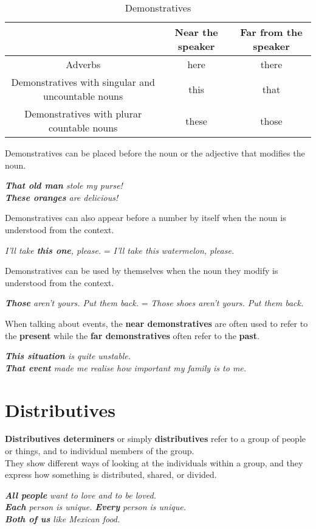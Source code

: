 \documentclass[10pt,a4paper]{article}
\begin{document}
\begin{table}[h]
\begin{center}
\begin{tabular}{|c|c|c|}
		\hline
		     	 & \textbf{Near the speaker} & \textbf{Far from the speaker} \\ \hline
		Adverbs  & here & there \\ \hline
		Demonstratives with singular and uncountable nouns & this & that \\ \hline
		Demonstratives with plurar countable nouns & these & those\\ \hline
\end{tabular}
\end{center}
\caption{\label{tab:nouns7}Demonstratives}
\end{table}
\newpage
Demonstratives can be placed before the noun or the adjective that modifies the noun.
\begin{center}
\textit{ \textbf{That old man} stole my purse!\\
\textbf{These oranges} are delicious!}
\end{center}
Demonstratives can also appear before a number by itself when the noun is understood from the context.
\begin{center}
\textit{I'll take \textbf{this one}, please.} = \textit{I'll take this watermelon, please.}
\end{center}
Demonstratives can be used by themselves when the noun they modify is understood from the context.
\begin{center}
\textit{ \textbf{Those} aren't yours. Put them back.} = \textit{Those shoes aren't yours. Put them back.}
\end{center}
When talking about events, the \textbf{near demonstratives} are often used to refer to the \textbf{present} while the \textbf{far demonstratives} often refer to the \textbf{past}.
\begin{center}
\textit{ \textbf{This situation} is quite unstable. \\
\textbf{That event} made me realise how important my family is to me.}
\end{center}

\section{Distributives}
\textbf{Distributives determiners} or simply \textbf{distributives} refer to a group of people or things, and to individual members of the group.\\
\indent They show different ways of looking at the individuals within a group, and they express how something is distributed, shared, or divided.
\begin{center}
\textit{ \textbf{All people} want to love and to be loved.\\
\textbf{Each} person is unique. \textbf{Every} person is unique.\\
\textbf{Both of us} like Mexican food.}
\end{center}
\end{document}
